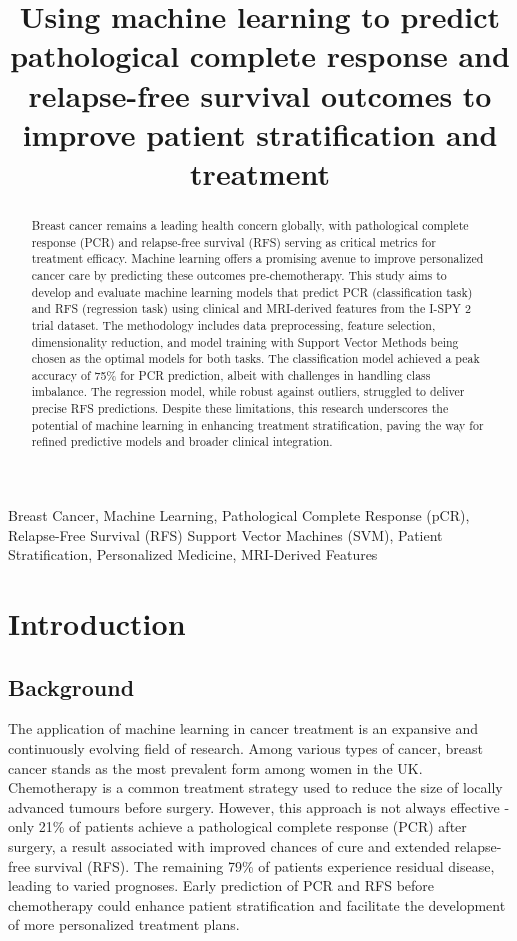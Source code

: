 \documentclass{article}
\title{
  Using machine learning to predict pathological complete response and relapse-free survival outcomes to improve patient stratification and treatment}
\begin{document}
%
\maketitle
%
\begin{abstract}
  Breast cancer remains a leading health concern globally, with pathological complete response (PCR) and relapse-free survival (RFS) serving as critical metrics for treatment efficacy. Machine learning offers a promising avenue to improve personalized cancer care by predicting these outcomes pre-chemotherapy. This study aims to develop and evaluate machine learning models that predict PCR (classification task) and RFS (regression task) using clinical and MRI-derived features from the I-SPY 2 trial dataset. The methodology includes data preprocessing, feature selection, dimensionality reduction, and model training with Support Vector Methods being chosen as the optimal models for both tasks. The classification model achieved a peak accuracy of 75\% for PCR prediction, albeit with challenges in handling class imbalance. The regression model, while robust against outliers, struggled to deliver precise RFS predictions. Despite these limitations, this research underscores the potential of machine learning in enhancing treatment stratification, paving the way for refined predictive models and broader clinical integration.
\end{abstract}
%
\begin{keywords}
  Breast Cancer, Machine Learning, Pathological Complete Response (pCR), Relapse-Free Survival (RFS)
  Support Vector Machines (SVM), Patient Stratification, Personalized Medicine, MRI-Derived Features
\end{keywords}
%
\section{Introduction}
\subsection{Background}

The application of machine learning in cancer treatment is an expansive and continuously evolving field of research. Among various types of cancer, breast cancer stands as the most prevalent form among women in the UK. Chemotherapy is a common treatment strategy used to reduce the size of locally advanced tumours before surgery. However, this approach is not always effective -  only 21\% of patients achieve a pathological complete response (PCR) after surgery,  a result associated with improved chances of cure and extended relapse-free survival (RFS). The remaining 79\% of patients experience residual disease, leading to varied prognoses\cite{spring2020pathologic}. Early prediction of PCR and RFS before chemotherapy could  enhance patient stratification and facilitate the development of more personalized treatment plans.
\end{document}
